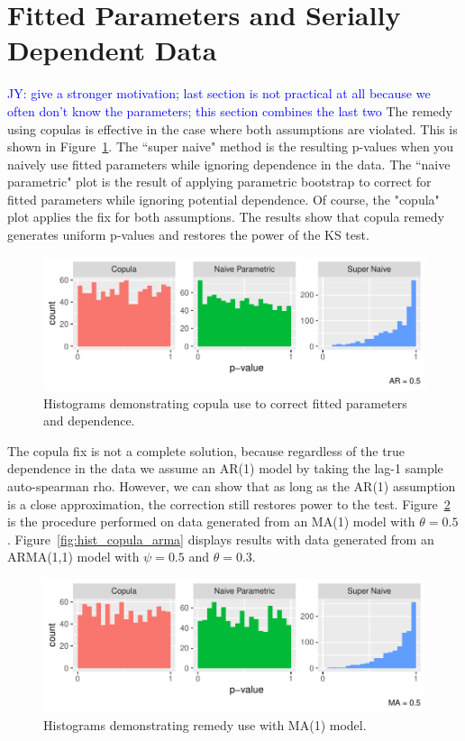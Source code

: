\documentclass[12pt, letterpaper, titlepage]{article}
\newcommand{\jy}[1]{\textcolor{blue}{JY: #1}}
\begin{document}
\section{Fitted Parameters and Serially Dependent Data}\label{sec:fittedwithdependence}

\jy{give a stronger motivation; last section is not practical at all because we
  often don't know the parameters; this section combines the last two}
The remedy using copulas is effective in the case where both assumptions are violated.
This is shown in Figure~\ref{fig:hist_copula}. The ``super naive" method is the resulting 
p-values when you naively use fitted parameters while ignoring dependence in the data.
The ``naive parametric" plot is the result of applying parametric bootstrap to correct
for fitted parameters while ignoring potential dependence. Of course, the "copula" 
plot applies the fix for both assumptions. The results show that copula remedy generates 
uniform p-values and restores the power of the KS test.

\begin{figure}[tbp]
  \centering
  \includegraphics{hist_copula}
  \caption{Histograms demonstrating copula use to correct fitted parameters and dependence.}
  \label{fig:hist_copula}
\end{figure}

The copula fix is not a complete solution, because regardless of the true dependence in the data
we assume an AR(1) model by taking the lag-1 sample auto-spearman rho. However, we can 
show that as long as the AR(1) assumption is a close approximation, the correction still restores power to the test.
Figure~\ref{fig:hist_copula_ma1} is the procedure performed on data generated from 
an MA(1) model with $\theta = 0.5$. Figure~\ref{fig:hist_copula_arma} displays results with 
data generated from an ARMA(1,1) model with $\psi = 0.5$ and $\theta = 0.3$. 

\begin{figure}[tbp]
  \centering
  \includegraphics{hist_copula_ma1}
  \caption{Histograms demonstrating remedy use with MA(1) model.}
  \label{fig:hist_copula_ma1}
\end{figure}
\end{document}
